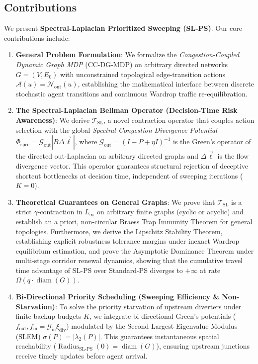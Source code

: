 \documentclass[11pt,a4paper]{article}
\begin{document}
\subsection{Contributions}
We present \textbf{Spectral-Laplacian Prioritized Sweeping (SL-PS)}. Our core contributions include:
\begin{enumerate}
    \item \textbf{General Problem Formulation}: We formalize the \textit{Congestion-Coupled Dynamic Graph MDP} (CC-DG-MDP) on arbitrary directed networks $G = (V, E_0)$ with unconstrained topological edge-transition actions $\mathcal{A}(u) = \mathcal{N}_{\text{out}}(u)$, establishing the mathematical interface between discrete stochastic agent transitions and continuous Wardrop traffic re-equilibration.
    \item \textbf{The Spectral-Laplacian Bellman Operator (Decision-Time Risk Awareness)}: We derive $\mathcal{T}_{\text{SL}}$, a novel contraction operator that couples action selection with the global \textit{Spectral Congestion Divergence Potential} $\Phi_{\text{spec}} = \mathcal{G}_{\text{out}} |B \Delta \vec{\ell}|$, where $\mathcal{G}_{\text{out}} = (I - P + \eta I)^{-1}$ is the Green's operator of the directed out-Laplacian on arbitrary directed graphs and $\Delta \vec{\ell}$ is the flow divergence vector. This operator guarantees structural rejection of deceptive shortcut bottlenecks at decision time, independent of sweeping iterations ($K = 0$).
    \item \textbf{Theoretical Guarantees on General Graphs}: We prove that $\mathcal{T}_{\text{SL}}$ is a strict $\gamma$-contraction in $L_\infty$ on arbitrary finite graphs (cyclic or acyclic) and establish an a priori, non-circular Braess Trap Immunity Theorem for general topologies. Furthermore, we derive the Lipschitz Stability Theorem, establishing explicit robustness tolerance margins under inexact Wardrop equilibrium estimation, and prove the Asymptotic Dominance Theorem under multi-stage corridor renewal dynamics, showing that the cumulative travel time advantage of SL-PS over Standard-PS diverges to $+\infty$ at rate $\Omega(q \cdot \operatorname{diam}(G))$.
    \item \textbf{Bi-Directional Priority Scheduling (Sweeping Efficiency \& Non-Starvation)}: To solve the priority starvation of upstream diverters under finite backup budgets $K$, we integrate bi-directional Green's potentials ($f_{\text{out}}, f_{\text{in}} = \mathcal{G}_{\text{in}} \xi_{\text{div}}$) modulated by the Second Largest Eigenvalue Modulus (SLEM) $\sigma(P) = |\lambda_2(P)|$. This guarantees instantaneous spatial reachability ($\operatorname{Radius}_{\text{SL-PS}}(0) = \operatorname{diam}(G)$), ensuring upstream junctions receive timely updates before agent arrival.

\end{enumerate}
\end{document}
